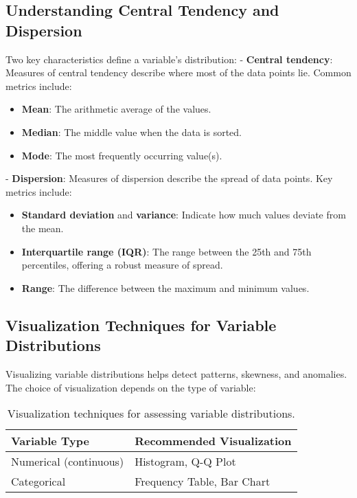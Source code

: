 \documentclass[12pt,openany, draft]{book}
\begin{document}
\subsection{Understanding Central Tendency and Dispersion}

Two key characteristics define a variable’s distribution:  
- \textbf{Central tendency}: Measures of central tendency describe where most of the data points lie. Common metrics include:
  \begin{itemize}
      \item \textbf{Mean}: The arithmetic average of the values.
      \item \textbf{Median}: The middle value when the data is sorted.
      \item \textbf{Mode}: The most frequently occurring value(s).
  \end{itemize}
- \textbf{Dispersion}: Measures of dispersion describe the spread of data points. Key metrics include:
  \begin{itemize}
      \item \textbf{Standard deviation} and \textbf{variance}: Indicate how much values deviate from the mean.
      \item \textbf{Interquartile range (IQR)}: The range between the 25th and 75th percentiles, offering a robust measure of spread.
      \item \textbf{Range}: The difference between the maximum and minimum values.
  \end{itemize}

\subsection{Visualization Techniques for Variable Distributions}

Visualizing variable distributions helps detect patterns, skewness, and anomalies. The choice of visualization depends on the type of variable:

\begin{table}[h]
    \centering
    \begin{tabular}{|l|l|}
        \hline
        \textbf{Variable Type} & \textbf{Recommended Visualization} \\
        \hline
        Numerical (continuous) & Histogram, Q-Q Plot \\
        Categorical & Frequency Table, Bar Chart \\
        \hline
    \end{tabular}
    \caption{Visualization techniques for assessing variable distributions.}
    \label{tab:viz_variable_distributions}
\end{table}
\end{document}
